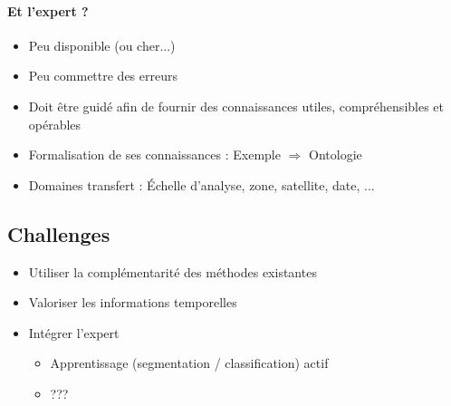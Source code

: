 \documentclass[11pt,a4paper]{article}
\begin{document}
	\paragraph{Et l'expert ?}
	\begin{itemize}
		\item Peu disponible (ou cher...)
		\item Peu commettre des erreurs
		\item Doit être guidé afin de fournir des connaissances utiles, compréhensibles et opérables
		\item Formalisation de ses connaissances : Exemple $\Rightarrow$ Ontologie
		\item Domaines transfert : Échelle d'analyse, zone, satellite, date, ...
	\end{itemize}

	\subsection{Challenges}
	\begin{itemize}
		\item Utiliser la complémentarité des méthodes existantes
		\item Valoriser les informations temporelles
		\item Intégrer l'expert
		\begin{itemize}
			\item Apprentissage (segmentation / classification) actif
			\item ???
		\end{itemize}
	\end{itemize}
	
\end{document}
